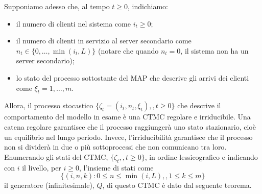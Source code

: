 \documentclass[11pt]{article}
\begin{document}
\noindent Supponiamo adesso che, al tempo $t\geq 0$, indichiamo:
\begin{itemize}
    \item il numero di clienti nel sistema come $i_t\geq 0$;
    \item il numero di clienti in servizio al server secondario come $n_t\in\{0,\ldots,\min(i_t,L)\}$ (notare che quando $n_t=0$, il sistema non ha un server secondario);
    \item lo stato del processo sottostante del MAP che descrive gli arrivi dei clienti come $\xi_t=1,\ldots,m$.
\end{itemize}
Allora, il processo stocastico $\{\zeta_t=(i_t,n_t,\xi_t),,t\geq 0\}$ che descrive il comportamento del modello in esame è una CTMC regolare e irriducibile. Una catena regolare garantisce che il processo raggiungerà uno stato stazionario, cioè un equilibrio nel lungo periodo. Invece, l'irriducibilità garantisce che il processo non si dividerà in due o più sottoprocessi che non comunicano tra loro. \\

\noindent Enumerando gli stati del CTMC, $\{\zeta_t,,t\geq 0\}$, in ordine lessicografico e indicando con $i$ il livello, per $i\geq 0$, l'insieme di stati come
$$\{(i,n,k):0\leq n\leq \min(i,L),,1\leq k\leq m\}$$
il generatore (infinitesimale), $Q$, di questo CTMC è dato dal seguente teorema.
\end{document}
